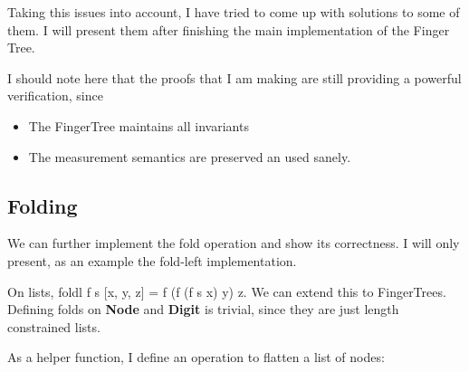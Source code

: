 \documentclass[12pt,twoside,notitlepage]{report}
\begin{document}
\begin{itemize}
\end{itemize}

Taking this issues into account, I have tried to come up with solutions to some of them. I will present them after finishing the main implementation of the Finger Tree.

I should note here that the proofs that I am making are still providing a powerful verification, since
\begin{itemize}
\item The FingerTree maintains all invariants
\item The measurement semantics are preserved an used sanely.
\end{itemize}

\subsection{Folding}

We can further implement the fold operation and show its correctness. I will only present, as an example the fold-left implementation.

On lists, foldl f s [x, y, z] = f (f (f s x) y) z. We can extend this to FingerTrees. Defining folds on \textbf{Node} and \textbf{Digit} is trivial, since they are just length constrained lists.

As a helper function, I define an operation to flatten a list of nodes: 

\begin{code}
\\
\> \AgdaSymbol{:}  \AgdaSymbol{\{}\AgdaSymbol{\}\{} \AgdaSymbol{:}  \AgdaSymbol{\}\{} \AgdaSymbol{:}   \AgdaSymbol{\}}\<%
\\
\>[6]\<[14]%
\>[14]  \AgdaSymbol{:}   \<%
\\
\>[6]\<[14]%
\>[14]  \AgdaSymbol{:}    \<%
\\
\>[6]\<[14]%
\>[14]  \AgdaSymbol{(}  \AgdaSymbol{)}\<%
\\
\>[6]\<[14]%
\>[14]  \<%
\\
\> \AgdaInductiveConstructor{[]} \AgdaSymbol{=} \AgdaInductiveConstructor{[]}\<%
\\
\> \AgdaSymbol{(}  \AgdaSymbol{)} \AgdaSymbol{=} \AgdaSymbol{(} \AgdaSymbol{)} \AgdaFunction{++} \AgdaSymbol{(} \AgdaSymbol{)}\<%
\\
\end{code}
\end{document}

